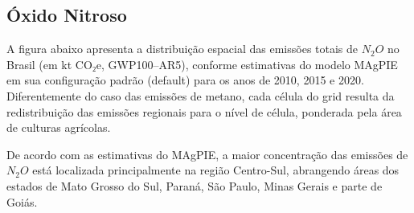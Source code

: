 \documentclass[
]{article}
\begin{document}
\subsection{Óxido Nitroso}\label{uxf3xido-nitroso}

A figura abaixo apresenta a distribuição espacial das emissões totais de
\(N_2O\) no Brasil (em kt CO₂e, GWP100--AR5), conforme estimativas do
modelo MAgPIE em sua configuração padrão (default) para os anos de 2010,
2015 e 2020. Diferentemente do caso das emissões de metano, cada célula
do grid resulta da redistribuição das emissões regionais para o nível de
célula, ponderada pela área de culturas agrícolas.

De acordo com as estimativas do MAgPIE, a maior concentração das
emissões de \(N_2O\) está localizada principalmente na região
Centro-Sul, abrangendo áreas dos estados de Mato Grosso do Sul, Paraná,
São Paulo, Minas Gerais e parte de Goiás.
\end{document}
